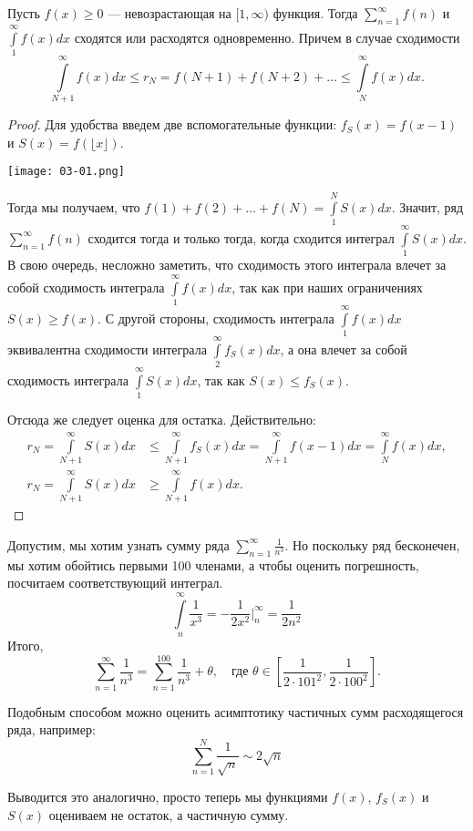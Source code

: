 \documentclass[a4paper, 12pt]{article}
\begin{document}
\begin{Test}

Пусть $f(x) \geqslant 0$ --- невозрастающая на $[1, \infty)$ функция. Тогда $\sum\limits_{n=1}^{\infty}f(n)$ и $\int\limits_1^{\infty}f(x)dx$ сходятся или расходятся одновременно. Причем в случае сходимости
$$
\int\limits_{N+1}^{\infty}f(x)dx \leqslant r_N = f(N+1) + f(N+2) + \ldots \leqslant \int\limits_N^\infty f(x)dx.
$$
\end{Test}

\begin{proof}
Для удобства введем две вспомогательные функции: $f_S(x) = f(x-1)$ и $S(x) = f(\lfloor x \rfloor)$.

\begin{center}
\texttt{[image: 03-01.png]}
\end{center}

Тогда мы получаем, что $f(1) + f(2) + \ldots + f(N) = \int\limits_1^N S(x)dx$. Значит, ряд $\sum\limits_{n=1}^\infty f(n)$ сходится тогда и только тогда, когда сходится интеграл $\int\limits_1^\infty S(x)dx$. В свою очередь, несложно заметить, что сходимость этого интеграла влечет за собой сходимость интеграла $\int\limits^\infty_1 f(x)dx$, так как  при наших ограничениях $S(x) \geqslant f(x)$. С другой стороны, сходимость интеграла $\int\limits_1^\infty f(x)dx$ эквивалентна сходимости интеграла $\int\limits_2^\infty f_S(x)dx$, а она влечет за собой сходимость интеграла $\int\limits_1^\infty  S(x)dx$, так как $S(x) \leq f_S(x)$.

Отсюда же следует оценка для остатка. Действительно:
\begin{align*}
r_{N} = \int\limits_{N+1}^\infty S(x) dx & \leqslant \int\limits_{N+1}^\infty f_S(x)dx = \int\limits_{N+1}^\infty f(x-1)dx = \int\limits_N^\infty f(x)dx, \\
r_{N} = \int\limits_{N+1}^\infty S(x)dx & \geqslant \int\limits_{N+1}^{\infty}f(x)dx.
\end{align*}
\end{proof}

\begin{Examples}
Допустим, мы хотим узнать сумму ряда $\sum\limits_{n=1}^{\infty}\frac{1}{n^3}$. Но поскольку ряд бесконечен, мы хотим обойтись первыми 100 членами, а чтобы оценить погрешность, посчитаем соответствующий интеграл.
$$
\int\limits_{n}^\infty \frac{1}{x^3} = -\frac{1}{2x^2} \Big|^\infty_{n} = \frac{1}{2n^2}
$$
Итого,
$$
\sum\limits_{n=1}^{\infty}\frac{1}{n^3} = \sum\limits_{n=1}^{100}\frac{1}{n^3} + \theta, \quad \text{где } \theta \in \left[\frac{1}{2\cdot101^2}, \frac{1}{2\cdot 100^2}\right].
$$

\end{Examples}

Подобным способом можно оценить асимптотику частичных сумм расходящегося ряда, например:
$$
\sum_{n=1}^{N} \frac{1}{\sqrt{n}} \sim 2\sqrt{n}
$$

Выводится это аналогично, просто теперь мы функциями $f(x)$, $f_S(x)$ и $S(x)$ оцениваем не остаток, а частичную сумму.
\end{document}
